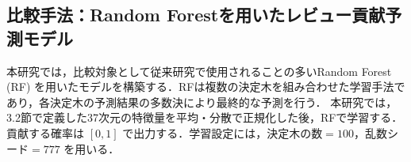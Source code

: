 \documentclass[submit,noauthor,ses,dvipdfmx]{ipsj}
\newcommand{\todo}[1]{\colorbox{yellow}{{\bf TODO}:}{\color{red} {\textbf{[#1]}}}}
\begin{document}



\subsection{比較手法：Random Forestを用いたレビュー貢献予測モデル}

本研究では，比較対象として従来研究で使用されることの多いRandom Forest (RF) を用いたモデルを構築する．RFは複数の決定木を組み合わせた学習手法であり，各決定木の予測結果の多数決により最終的な予測を行う．
本研究では，3.2節で定義した37次元の特徴量を平均・分散で正規化した後，RFで学習する\cite{breiman_rf}．貢献する確率は $[0, 1]$ で出力する．学習設定には，決定木の数$= 100$，乱数シード$=777$ を用いる．

\end{document}
